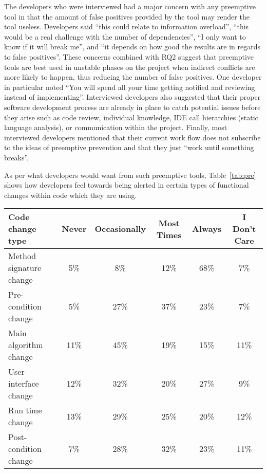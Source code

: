 \documentclass[conference]{IEEEtran}
\begin{document}
The developers who were interviewed had a major concern with any preemptive tool in that the amount of false positives
provided by the tool may render the tool useless. Developers said ``this could relate to information overload'', ``this would
be a real challenge with the number of dependencies'', ``I only want to know if it will break me'', and ``it depends on how
good the results are in regards to false positives''. These concerns combined with RQ2 suggest that preemptive tools are
best used in unstable phases on the project when indirect conflicts are more likely to happen, thus reducing the number of false
positives. One developer in particular noted ``You will spend all your time getting notified and reviewing instead of implementing''.
Interviewed developers also suggested that their proper software development process are already in place to
catch potential issues before they arise such as code review, individual knowledge, IDE call hierarchies (static language analysis),
or communication within the project. Finally, most interviewed developers mentioned that their current work flow does
not subscribe to the ideas of preemptive prevention and that they just ``work until something breaks''. 

As per what developers would want from such preemptive tools, Table~\ref{tab:pre} shows how developers feel towards being 
alerted in certain types of functional changes within code which they are using.

\begin{table*}[tb!]
\begin{center}
\begin{tabular}{| p{7cm} | c | c | c | c | c |}
\hline
Code change type &Never  & Occasionally & Most Times & Always & I Don't Care \\
\hline
\hline
Method signature change & 5\% & 8\% & 12\% & 68\% & 7\% \\ \hline
Pre-condition change & 5\% & 27\% & 37\% & 23\% & 7\% \\ \hline
Main algorithm change & 11\% & 45\% & 19\% & 15\% & 11\% \\ \hline
User interface change & 12\% & 32\% & 20\% & 27\% & 9\% \\ \hline
Run time change & 13\% & 29\% & 25\% & 20\% & 12\% \\ \hline
Post-condition change & 7\% & 28\% & 32\% & 23\% & 11\% \\ \hline
\end{tabular}
\end{center}
\caption{Results of survey questions to source code changes that developers deem notification worthy, in terms of percentage
of developers surveyed.\label{tab:pre}}
\end{table*}
\end{document}
